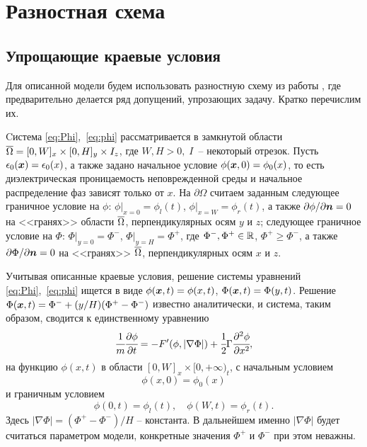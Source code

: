 
\section{Разностная схема}

\subsection{Упрощающие краевые условия}

Для описанной модели будем использовать разностную схему из работы \cite{ponomarev_stability}, где предварительно делается ряд допущений, упрозающих задачу. Кратко перечислим их.

Cистема \eqref{eq:Phi},~\eqref{eq:phi} рассматривается в замкнутой области $\clOmega = [0, W]_x \hm \times [0, H]_y \times I_z$, где $W, H > 0, \; I$~-- некоторый отрезок. Пусть $\epsilon_0({\boldsymbol{x}}) = \epsilon_0(x)$, а также задано начальное условие $\phi({\boldsymbol{x}}, 0) = \phi_0(x)$, то есть диэлектрическая проницаемость неповрежденной среды и начальное распределение фаз зависят только от $x$. На $\partial \Omega$ считаем заданным следующее граничное условие на $\phi$: $\phi|_{x = 0} = \phi_l(t)$, $\phi|_{x = W} = \phi_r(t)$, а также $\partial \phi / \partial {\boldsymbol{n}}= 0$ на <<гранях>> области ${\overline{\Omega}}$, перпендикулярных осям $y$ и $z$; следующее граничное условие на $\Phi$: $\Phi|_{y = 0} = \Phi^-$, $\Phi|_{y = H} = \Phi^+$, где $\Phi^-, \Phi^+ \in {\mathbb{R}}$, $\Phi^+ \geqslant \Phi^-$, а также $\partial \Phi / \partial {\boldsymbol{n}} = 0$ на <<гранях>> ${\overline{\Omega}}$, перпендикулярных осям $x$ и $z$.

Учитывая описанные краевые условия, решение системы уравне\forcehyphenation ний \eqref{eq:Phi},~\eqref{eq:phi} ищется в виде $\phi({\boldsymbol{x}}, t) = \phi(x, t)$, $\Phi({\boldsymbol{x}}, t) = \Phi(y, t)$. Решение \linebreak $\Phi({\boldsymbol{x}}, t) = \Phi^- + (y / H)(\Phi^+ - \Phi^-)$ известно аналитически, и система, таким образом, сводится к единственному уравнению
\begin{equation}
	\cfrac{1}{m} \cfrac{\partial \phi}{\partial t} = -F'(\phi, |\nabla \Phi|) + \cfrac{1}{2} \Gamma \cfrac{\partial^2 \phi}{\partial x^2},
	\label{eq:one_dim}
\end{equation}
на функцию $\phi(x, t)$ в области $[0, W]_x \times [0, +\infty)_t$, с начальным условием
\begin{equation}
	\phi(x, 0) = \phi_0(x)
	\label{eq:one_dim_initial}{}
\end{equation}
и граничным условием
\begin{equation}
	\phi(0, t) = \phi_l(t), \quad \phi(W, t) = \phi_r(t).
	\label{eq:one_dim_marginal}
\end{equation}
Здесь $|\nabla \Phi| = (\Phi^+ - \Phi^-) / H$ -- константа. В дальнейшем именно $|\nabla \Phi|$ будет считаться параметром модели, конкретные значения $\Phi^+$ и $\Phi^-$ при этом неважны.

